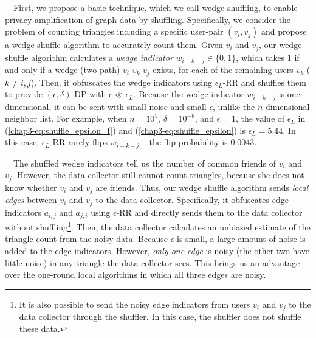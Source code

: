 \smallskip
{}~~First, we propose a basic technique, which we call wedge shuffling, to enable privacy amplification of graph data by shuffling. 
Specifically, we consider the problem of counting triangles including a specific user-pair $(v_i, v_j)$ 
and propose a wedge shuffle algorithm to accurately count them. 
Given $v_i$ and $v_j$, 
our wedge shuffle algorithm calculates a \textit{wedge indicator} $w_{i-k-j} \in \{0,1\}$, which 
takes $1$ if and only if a wedge (two-path) 
$v_i$-$v_k$-$v_j$ 
exists, 
for each of the remaining users $v_k$ ($k \ne i, j$). 
Then, it 
obfuscates the wedge indicators using $\epsilon_L$-RR and shuffles them to provide $(\epsilon, \delta)$-DP with $\epsilon \ll \epsilon_L$. 
Because the wedge indicator $w_{i-k-j}$ is one-dimensional, it can be sent with 
small noise 
and small $\epsilon$, 
unlike the $n$-dimensional neighbor list. 
For example, when $n=10^5$, $\delta=10^{-8}$, and $\epsilon=1$, the value of $\epsilon_L$ in (\ref{chap3-eq:shuffle_epsilon_f}) and (\ref{chap3-eq:shuffle_epsilon}) is $\epsilon_L = 5.44$. 
In this case, $\epsilon_L$-RR rarely flips $w_{i-k-j}$ -- the flip probability is $0.0043$. 

\smallskip
{}~~The shuffled wedge indicators tell us the number of common friends of $v_i$ and $v_j$. 
However, the data collector still cannot count triangles, because she does not know whether $v_i$ and $v_j$ are friends. 
Thus, our wedge shuffle algorithm sends \textit{local edges} between $v_i$ and $v_j$ to the data collector. 
Specifically, it 
obfuscates edge indicators $a_{i,j}$ and $a_{j,i}$ using $\epsilon$-RR and directly sends 
them 
to the data collector without shuffling\footnote{It is also possible to send the noisy edge indicators from users $v_i$ and $v_j$ to the data collector through the shuffler. In this case, the shuffler does not shuffle these data.}. 
Then, the data collector calculates an unbiased estimate of the triangle count from the noisy data. 
Because $\epsilon$ is small, a large amount of noise is added to the edge indicators. 
However, \textit{only one edge} is noisy (the other two have little noise) in any triangle the data collector sees. 
This brings us an advantage over the one-round local algorithms in which all three edges are noisy. 

